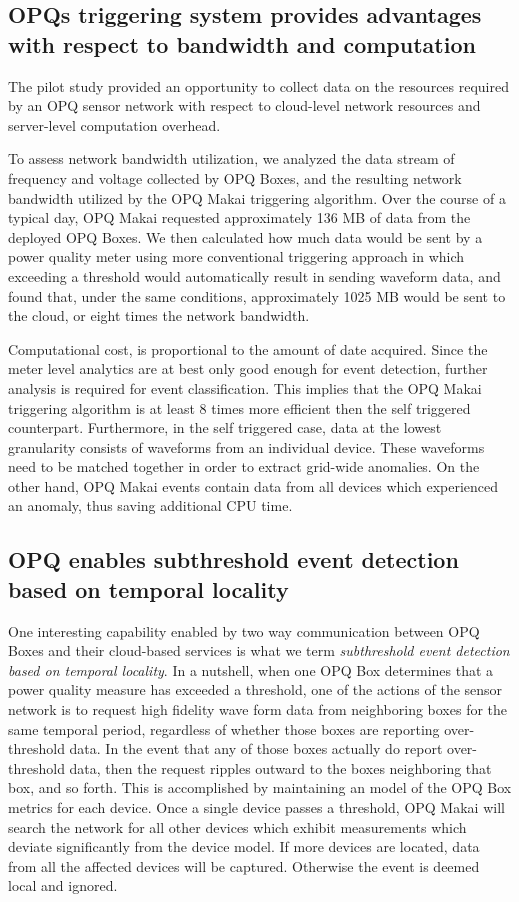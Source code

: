 \subsection{OPQs triggering system provides advantages with respect to bandwidth and computation}

The pilot study provided an opportunity to collect data on the resources required by an OPQ sensor network with respect to cloud-level network resources and server-level computation overhead.

To assess network bandwidth utilization, we analyzed the data stream of frequency and voltage collected by OPQ Boxes, and the resulting network bandwidth utilized by the OPQ Makai triggering algorithm. Over the course of a typical day, OPQ Makai requested approximately 136 MB of data from the deployed OPQ Boxes.  We then calculated how much data would be sent by a power quality meter using more conventional triggering approach in which exceeding a threshold would automatically result in sending waveform data, and found that, under the same conditions, approximately 1025 MB would be sent to the cloud, or eight times the network bandwidth.

Computational cost, is proportional to the amount of date acquired. Since the meter level analytics are at best only good enough for event detection, further analysis is required for event classification.
This implies that the OPQ Makai triggering algorithm is at least 8 times more efficient then the self triggered counterpart. 
Furthermore, in the self triggered case, data at the lowest granularity consists of waveforms from an individual device.
These waveforms need to be matched together in order to extract grid-wide anomalies.
On the other hand, OPQ Makai events contain data from all devices which experienced an anomaly, thus saving additional CPU time. 

\subsection{OPQ enables subthreshold event detection based on temporal locality}
\label{sec:subthreshold-events}

One interesting capability enabled by two way communication between OPQ Boxes and their cloud-based services is what we term {\em subthreshold event detection based on temporal locality}.
In a nutshell, when one OPQ Box determines that a power quality measure has exceeded a threshold, one of the actions of the sensor network is to request high fidelity wave form data from neighboring boxes for the same temporal period, regardless of whether those boxes are reporting over-threshold data.
In the event that any of those boxes actually do report over-threshold data, then the request ripples outward to the boxes neighboring that box, and so forth.
This is accomplished by maintaining an model of the OPQ Box metrics for each device.
Once a single device passes a threshold, OPQ Makai will search the network for all other devices which exhibit measurements which deviate significantly from the device model.
If more devices are located, data from all the affected devices will be captured.
Otherwise the event is deemed local and ignored.

